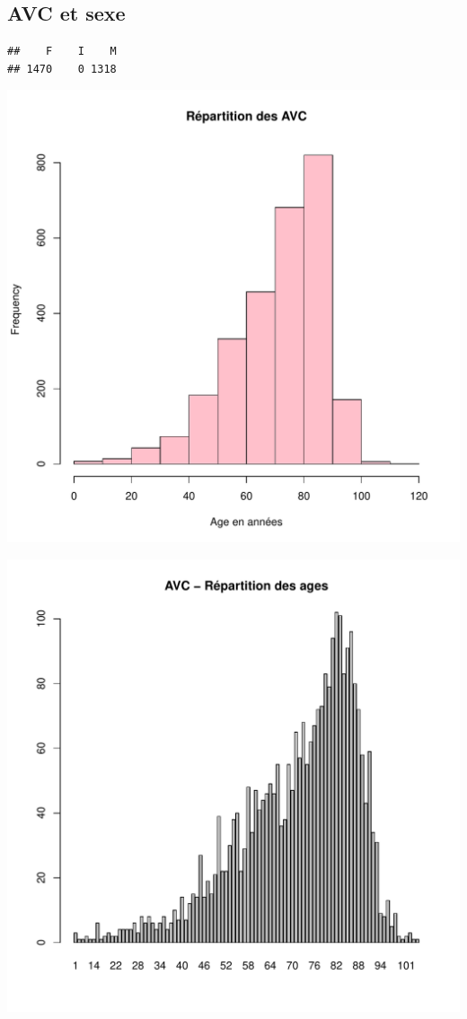 \documentclass[12pt,english,french,twoside]{book}\usepackage[]{graphicx}\usepackage[]{color}
\makeatletter
\def\maxwidth{ %
  \ifdim\Gin@nat@width>\linewidth
    \linewidth
  \else
    \Gin@nat@width
  \fi
}
\newenvironment{kframe}{%
 \def\at@end@of@kframe{}%
 \ifinner\ifhmode%
  \def\at@end@of@kframe{\end{minipage}}%
  \begin{minipage}{\columnwidth}%
 \fi\fi%
 \def\FrameCommand##1{\hskip\@totalleftmargin \hskip-\fboxsep
 \colorbox{shadecolor}{##1}\hskip-\fboxsep
     \hskip-\linewidth \hskip-\@totalleftmargin \hskip\columnwidth}%
 \MakeFramed {\advance\hsize-\width
   \@totalleftmargin\z@ \linewidth\hsize
   \@setminipage}}%
 {\par\unskip\endMakeFramed%
 \at@end@of@kframe}
\newenvironment{knitrout}{}{} %
\makeatother
\begin{document}
\subsection*{AVC et sexe}
\begin{knitrout}
\color{fgcolor}\begin{kframe}
\begin{verbatim}
##    F    I    M 
## 1470    0 1318
\end{verbatim}
\end{kframe}
\includegraphics[width=\maxwidth]{figure/avc_sexe1} 

\includegraphics[width=\maxwidth]{figure/avc_sexe2} 


\end{knitrout}
\end{document}
